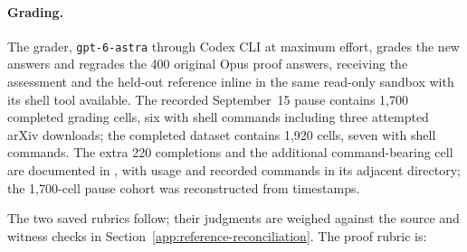 \paragraph{Grading.}
The grader, \texttt{gpt-6-astra} through Codex CLI at maximum effort, grades the new answers and regrades the 400 original Opus proof answers, receiving the assessment and the held-out reference inline in the same read-only sandbox with its shell tool available. The recorded September~15 pause contains 1,700 completed grading cells, six with shell commands including three attempted arXiv downloads; the completed dataset contains 1,920 cells, seven with shell commands. The extra 220 completions and the additional command-bearing cell are documented in , with usage and recorded commands in its adjacent  directory; the 1,700-cell pause cohort was reconstructed from timestamps.

The two saved rubrics follow; their judgments are weighed against the source and witness checks in Section~\ref{app:reference-reconciliation}. The proof rubric is:


